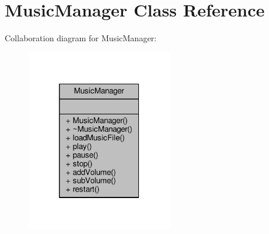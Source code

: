 \hypertarget{class_music_manager}{}\section{Music\+Manager Class Reference}
\label{class_music_manager}


Collaboration diagram for Music\+Manager\+:\nopagebreak
\begin{figure}[H]
\begin{center}
\leavevmode
\includegraphics[width=181pt]{d3/dfa/class_music_manager__coll__graph}
\end{center}
\end{figure}
